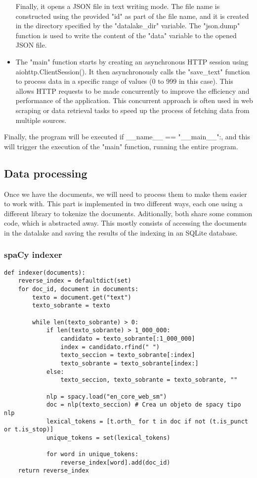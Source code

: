\documentclass{article}
\begin{document}
\begin{itemize}
		Finally, it opens a JSON file in text writing mode. The file name is constructed using the provided "id" as part of the file name, and it is created in the directory specified by the "datalake\_dir" variable. The "json.dump" function is used to write the content of the "data" variable to the opened JSON file.
	\item The "main" function starts by creating an asynchronous HTTP session using aiohttp.ClientSession(). It then asynchronously calls the "save\_text" function to process data in a specific range of values (0 to 999 in this case). This allows HTTP requests to be made concurrently to improve the efficiency and performance of the application. This concurrent approach is often used in web scraping or data retrieval tasks to speed up the process of fetching data from multiple sources.
\end{itemize}

Finally, the program will be executed if \_\_name\_\_ == "\_\_main\_\_":, and this will trigger the execution of the "main" function, running the entire program.

\subsection{Data processing}

Once we have the documents, we will need to process them to make them easier to work with.
This part is implemented in two different ways, each one using
a different library to tokenize the documents.
Aditionally, both share some common code, which is abstracted away. This mostly consists
of accessing the documents in the datalake and saving the results of the indexing
in an SQLite database.

\subsubsection{spaCy indexer}

\begin{verbatim}
def indexer(documents):
	reverse_index = defaultdict(set)
	for doc_id, document in documents:
		texto = document.get("text")
		texto_sobrante = texto

		while len(texto_sobrante) > 0:
			if len(texto_sobrante) > 1_000_000:
				candidato = texto_sobrante[:1_000_000]
				index = candidato.rfind(" ")
				texto_seccion = texto_sobrante[:index]
				texto_sobrante = texto_sobrante[index:]
			else:
				texto_seccion, texto_sobrante = texto_sobrante, ""

			nlp = spacy.load("en_core_web_sm")
			doc = nlp(texto_seccion) # Crea un objeto de spacy tipo nlp
			lexical_tokens = [t.orth_ for t in doc if not (t.is_punct or t.is_stop)]
			unique_tokens = set(lexical_tokens)

			for word in unique_tokens:
				reverse_index[word].add(doc_id)
	return reverse_index
\end{verbatim}
\end{document}
